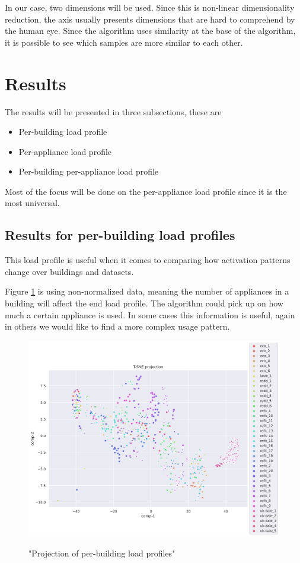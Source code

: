 In our case, two dimensions will be used. Since this is non-linear dimensionality reduction,
the axis usually presents dimensions that are hard to comprehend by the human eye. 
Since the algorithm uses similarity at the base of the algorithm, it is possible to 
see which samples are more similar to each other.
\section{Results}

The results will be presented in three subsections, these are

\begin{itemize}
	\item Per-building load profile
	\item Per-appliance load profile
	\item Per-building per-appliance load profile
\end{itemize}

Most of the focus will be done on the per-appliance load profile since it is the most universal.

\subsection{Results for per-building load profiles}

This load profile is useful when it comes to comparing how 
activation patterns change over buildings and datasets.

Figure \ref{fig:tsne_scatter_non_norm_all} is using non-normalized data, meaning
the number of appliances in a building will affect the end load profile.
The algorithm could pick up on how much a certain appliance is used.
In some cases this information is useful, 
again in others we would like to find a more complex usage pattern.

\begin{figure}[H]
	\centering
	\caption{"Projection of per-building load profiles"}
	\includegraphics[width=1.2\textwidth]{Figures/TSNE/TSNE_per_building/non_norm/scatter_non_norm_all.png}
	\label{fig:tsne_scatter_non_norm_all}
\end{figure}

